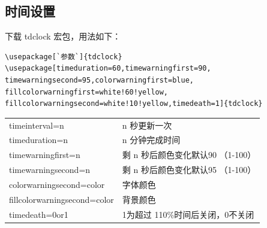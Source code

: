 \subsection{时间设置}




下载 tdclock 宏包，用法如下：
\begin{lstlisting}[language={[LaTeX]TeX}]
\usepackage[`参数`]{tdclock}
\usepackage[timeduration=60,timewarningfirst=90,
timewarningsecond=95,colorwarningfirst=blue,
fillcolorwarningfirst=white!60!yellow,
fillcolorwarningsecond=white!10!yellow,timedeath=1]{tdclock}
\end{lstlisting}
\begin{tabular}{ll}
  timeinterval=n & n 秒更新一次 \\
  timeduration=n & n 分钟完成时间 \\
  timewarningfirst=n & 剩 n 秒后颜色变化默认90 （1-100）\\
  timewarningsecond=n & 剩 n 秒后颜色变化默认95 （1-100）\\
  colorwarningsecond=color  & 字体颜色 \\
  fillcolorwarningsecond=color & 背景颜色 \\
  timedeath=0or1 & 1为超过 110\%时间后关闭，0不关闭 \\
\end{tabular}



